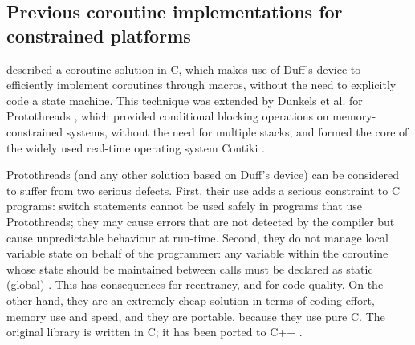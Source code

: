\subsection{Previous coroutine implementations for constrained platforms}
\label{previous-implementations}

\DIFdelbegin {}\DIFdelend \DIFaddbegin {}\DIFaddend described a coroutine solution in C, which makes use of Duff’s device \DIFdelbegin {}\DIFdelend to efficiently implement coroutines through macros, without the need to explicitly code a state machine\DIFdelbegin {}\DIFdelend \DIFaddbegin {}\DIFaddend . This technique was extended by Dunkels et al. for Protothreads \cite{Dunkels2006}, which provided conditional blocking operations on memory-constrained systems, without the need for multiple stacks, and formed the core of the widely used real-time operating system Contiki \cite{Dunkels2004}.

Protothreads (and any other solution based on Duff’s device) can be considered to suffer from two serious defects. First, their use adds a serious constraint to C programs: switch statements cannot be used safely in programs that use Protothreads; they may cause errors that are not detected by the compiler but cause unpredictable behaviour at run-time. Second, they do not manage local variable state on behalf of the programmer: any variable within the coroutine whose state should be maintained between calls must be declared as static (global) \cite{Dunkels2005b}. This has consequences for reentrancy, and for code quality. On the other hand, they are an extremely cheap solution in terms of coding effort, memory use and speed, and they are portable, because they use pure C. The original library is written in C; it has been ported to C++ \cite{Paisley2006}.

